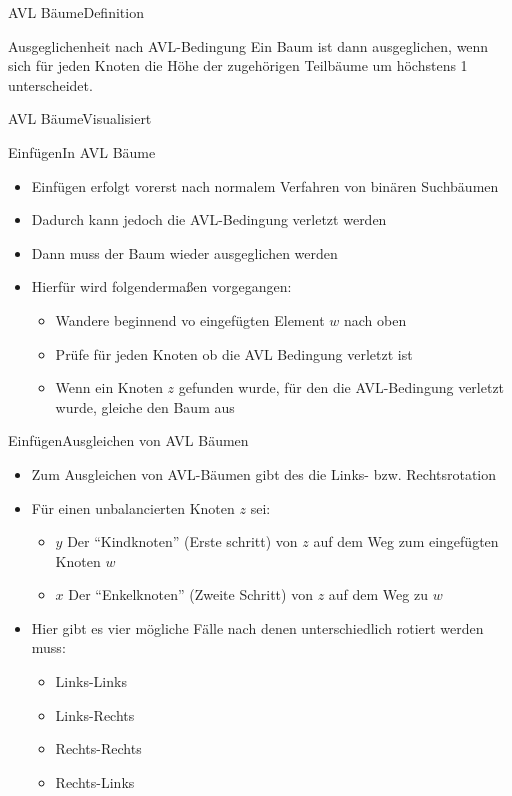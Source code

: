 \begin{frame}{AVL Bäume}{Definition}
	\vfill
	\begin{alertblock}{Ausgeglichenheit nach AVL-Bedingung}
	Ein Baum ist dann ausgeglichen, wenn sich für jeden Knoten die Höhe der zugehörigen Teilbäume um
	höchstens 1 unterscheidet.
	\end{alertblock}
	\vfill
\end{frame}

\begin{frame}{AVL Bäume}{Visualisiert}
\end{frame}

\begin{frame}{Einfügen}{In AVL Bäume}
	\begin{itemize}
		\item Einfügen erfolgt vorerst nach normalem Verfahren von binären Suchbäumen
		\item Dadurch kann jedoch die AVL-Bedingung verletzt werden
		\item Dann muss der Baum wieder ausgeglichen werden
		\item Hierfür wird folgendermaßen vorgegangen:
		\begin{itemize}
			\item Wandere beginnend vo eingefügten Element $w$ nach oben
			\item Prüfe für jeden Knoten ob die AVL Bedingung verletzt ist
			\item Wenn ein Knoten $z$ gefunden wurde, für den die AVL-Bedingung verletzt wurde, gleiche den Baum aus
		\end{itemize}
	\end{itemize}
\end{frame}

\begin{frame}{Einfügen}{Ausgleichen von AVL Bäumen}
	\begin{itemize}
		\item Zum Ausgleichen von AVL-Bäumen gibt des die Links- bzw. Rechtsrotation
		\item Für einen unbalancierten Knoten $z$ sei:
		\begin{itemize}
			\item $y$ Der "`Kindknoten"' (Erste schritt) von $z$ auf dem Weg zum eingefügten Knoten $w$
			\item $x$ Der "`Enkelknoten"' (Zweite Schritt) von $z$ auf dem Weg zu $w$
		\end{itemize}
		\item Hier gibt es vier mögliche Fälle nach denen unterschiedlich rotiert werden muss:
		\begin{itemize}
			\item Links-Links
			\item Links-Rechts
			\item Rechts-Rechts
			\item Rechts-Links
		\end{itemize}
	\end{itemize}
\end{frame}

